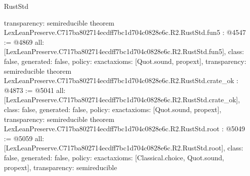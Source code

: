 \begin{lexlean}{RustStd}
\begin{coremodule}
{  transparency: semireducible
}
theorem LexLeanPreserve.C717ba802714ecdff7bc1d704c0828e6c.R2.RustStd.fun5 : @4547 := @4869 {
  all: [LexLeanPreserve.C717ba802714ecdff7bc1d704c0828e6c.R2.RustStd.fun5],
  class: false,
  generated: false,
  policy: exact{axioms: [Quot.sound, propext]},
  transparency: semireducible
}
theorem LexLeanPreserve.C717ba802714ecdff7bc1d704c0828e6c.R2.RustStd.crate_ok : @4873 := @5041 {
  all: [LexLeanPreserve.C717ba802714ecdff7bc1d704c0828e6c.R2.RustStd.crate_ok],
  class: false,
  generated: false,
  policy: exact{axioms: [Quot.sound, propext]},
  transparency: semireducible
}
theorem LexLeanPreserve.C717ba802714ecdff7bc1d704c0828e6c.R2.RustStd.root : @5049 := @5059 {
  all: [LexLeanPreserve.C717ba802714ecdff7bc1d704c0828e6c.R2.RustStd.root],
  class: false,
  generated: false,
  policy: exact{axioms: [Classical.choice, Quot.sound, propext]},
  transparency: semireducible
}


\end{coremodule}
\end{lexlean}
